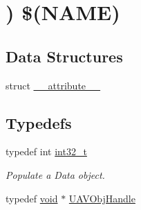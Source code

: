 \hypertarget{group___n_a_m_e}{\section{) \$(N\-A\-M\-E)}
\label{group___n_a_m_e}
}


 


\subsection*{Data Structures}
\begin{DoxyCompactItemize}
\item 
struct \hyperlink{struct____attribute____}{\-\_\-\-\_\-attribute\-\_\-\-\_\-}
\end{DoxyCompactItemize}
\subsection*{Typedefs}
\begin{DoxyCompactItemize}
\item 
typedef int \hyperlink{group___n_a_m_e_gafd12020da5a235dfcf0c3c748fb5baed}{int32\-\_\-t}
\begin{DoxyCompactList}\small\item\em Populate a Data object. \end{DoxyCompactList}\item 
typedef \hyperlink{group___n_a_m_e_ga18028b8badbf1ea7e704ccac3c488e82}{void} $\ast$ \hyperlink{group___n_a_m_e_gac31715ab50a1903838e7d87c8022ec75}{U\-A\-V\-Obj\-Handle}
\end{DoxyCompactItemize}
